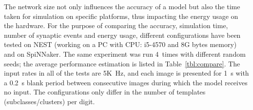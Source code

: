 The network size not only influences the accuracy of a model but also the time taken for simulation on specific platforms, thus impacting the energy usage on the hardware.
For the purpose of comparing the accuracy, simulation time, number of synaptic events and energy usage, different configurations have been tested on NEST (working on a PC with CPU: i5-4570 and 8G bytes memory) and on SpiNNaker.
The same experiment was run 4~times with different random seeds; the average performance estimation is listed in Table~\ref{tbl:compare}.
The input rates in all of the tests are 5K~Hz, and each image is presented for 1~s with a 0.2~s blank period between consecutive images during which the model receives no input.
The configurations only differ in the number of templates (subclasses/clusters) per digit.
